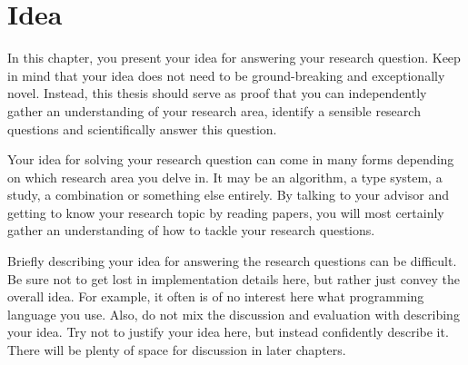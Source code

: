 \chapter{Idea}\label{ch:Idea}
In this chapter, you present your idea for answering your research question.
Keep in mind that your idea does not need to be ground-breaking and exceptionally novel. 
Instead, this thesis should serve as proof that you can independently gather an understanding of your research area, identify a sensible research questions and scientifically answer this question.

Your idea for solving your research question can come in many forms depending on which research area you delve in.
It may be an algorithm, a type system, a study, a combination or something else entirely.
By talking to your advisor and getting to know your research topic by reading papers, you will most certainly gather an understanding of how to tackle your research questions.

Briefly describing your idea for answering the research questions can be difficult.
Be sure not to get lost in implementation details here, but rather just convey the overall idea. 
For example, it often is of no interest here what programming language you use.
Also, do not mix the discussion and evaluation with describing your idea.
Try not to justify your idea here, but instead confidently describe it.
There will be plenty of space for discussion in later chapters. 
